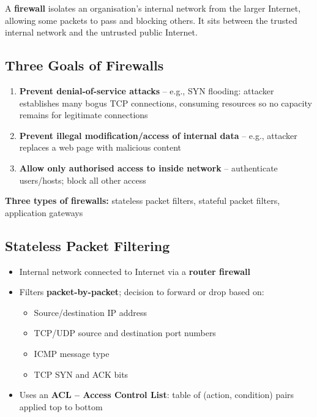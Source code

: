 \begin{tcolorbox}[keybox, title=Firewall Definition]
A \textbf{firewall} isolates an organisation's internal network from the larger Internet, allowing some packets to pass and blocking others. It sits between the trusted internal network and the untrusted public Internet.
\end{tcolorbox}

\subsection{Three Goals of Firewalls}

\begin{tcolorbox}[keybox, title=Why Firewalls -- Three Goals]
\begin{enumerate}[noitemsep]
  \item \textbf{Prevent denial-of-service attacks} -- e.g., SYN flooding: attacker establishes many bogus TCP connections, consuming resources so no capacity remains for legitimate connections
  \item \textbf{Prevent illegal modification/access of internal data} -- e.g., attacker replaces a web page with malicious content
  \item \textbf{Allow only authorised access to inside network} -- authenticate users/hosts; block all other access
\end{enumerate}
\textbf{Three types of firewalls:} stateless packet filters, stateful packet filters, application gateways
\end{tcolorbox}

\subsection{Stateless Packet Filtering}

\begin{tcolorbox}[keybox, title=Stateless Packet Filtering]
\begin{itemize}[noitemsep]
  \item Internal network connected to Internet via a \textbf{router firewall}
  \item Filters \textbf{packet-by-packet}; decision to forward or drop based on:
    \begin{itemize}[noitemsep]
      \item Source/destination IP address
      \item TCP/UDP source and destination port numbers
      \item ICMP message type
      \item TCP SYN and ACK bits
    \end{itemize}
  \item Uses an \textbf{ACL -- Access Control List}: table of (action, condition) pairs applied top to bottom
\end{itemize}
\end{tcolorbox}

